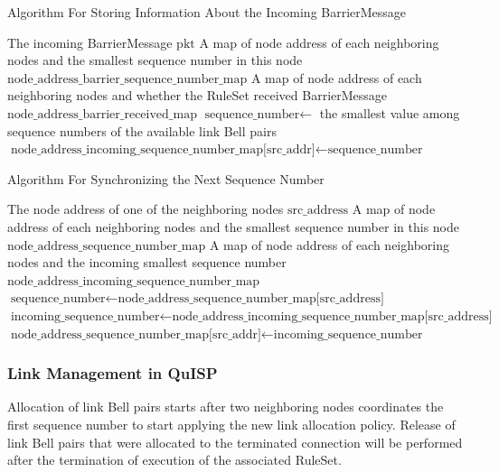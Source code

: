 \begin{algorithm}[H]  
  \caption{Algorithm For Storing Information About the Incoming BarrierMessage}                 
  \begin{algorithmic}[1]
  \Require The incoming BarrierMessage $\text{pkt}$
    \Require A map of node address of each neighboring nodes and the smallest sequence number in this node $\text{node\_address\_barrier\_sequence\_number\_map}$
    \Require A map of node address of each neighboring nodes and whether the RuleSet received BarrierMessage $\text{node\_address\_barrier\_received\_map}$
    \State $\text{sequence\_number} \gets$ the smallest value among sequence numbers of the available link Bell pairs
    \State $\text{node\_address\_incoming\_sequence\_number\_map[src\_addr]} \gets \text{sequence\_number}$
  \end{algorithmic}
\end{algorithm}

\begin{algorithm}[H]  
  \caption{Algorithm For Synchronizing the Next Sequence Number}                 
  \begin{algorithmic}[1]
    \Require The node address of one of the neighboring nodes $\text{src\_address}$
    \Require A map of node address of each neighboring nodes and the smallest sequence number in this node $\text{node\_address\_sequence\_number\_map}$
    \Require A map of node address of each neighboring nodes and the incoming smallest sequence number $\text{node\_address\_incoming\_sequence\_number\_map}$
    \State $\text{sequence\_number} \gets \text{node\_address\_sequence\_number\_map[src\_address]}$
    \State $\text{incoming\_sequence\_number} \gets \text{node\_address\_incoming\_sequence\_number\_map[src\_address]}$
      \State $\text{node\_address\_sequence\_number\_map[src\_addr]} \gets \text{incoming\_sequence\_number}$
    \EndIf
  \end{algorithmic}
\end{algorithm}

\subsubsection{Link Management in QuISP}

Allocation of link Bell pairs starts after two neighboring nodes coordinates the first sequence number to start applying the new link allocation policy.
Release of link Bell pairs that were allocated to the terminated connection will be performed after the termination of execution of the associated RuleSet.

